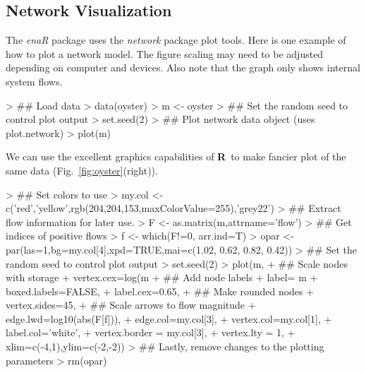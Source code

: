 \documentclass[article]{jss}
\newcommand{\R}{\textbf{R}}
\begin{document}

\subsection{Network Visualization}

The \textit{enaR} package uses the \textit{network} package plot
 tools. Here is
one example of how to plot a network model. The figure scaling may
need to be adjusted depending on computer and devices. Also note that
the graph only shows internal system flows.

\begin{Schunk}
\begin{Sinput}
> ## Load data
> data(oyster)
> m <- oyster
> ## Set the random seed to control plot output
> set.seed(2)
> ## Plot network data object (uses plot.network)
> plot(m)
\end{Sinput}
\end{Schunk}

We can use the excellent graphics capabilities of \R\ to make fancier
plot of the same data (Fig.~\ref{fig:oyster}(right)).


\begin{Schunk}
\begin{Sinput}
> ## Set colors to use
> my.col <- c('red','yellow',rgb(204,204,153,maxColorValue=255),'grey22')
> ## Extract flow information for later use.
> F <- as.matrix(m,attrname='flow')
> ## Get indices of positive flows
> f <- which(F!=0, arr.ind=T)
> opar <- par(las=1,bg=my.col[4],xpd=TRUE,mai=c(1.02, 0.62, 0.82, 0.42))
> ## Set the random seed to control plot output
> set.seed(2)
> plot(m,
+  ## Scale nodes with storage
+       vertex.cex=log(m%
+  ## Add node labels
+       label= m%
+       boxed.labels=FALSE,
+       label.cex=0.65,
+  ## Make rounded nodes
+       vertex.sides=45,
+  ## Scale arrows to flow magnitude
+       edge.lwd=log10(abs(F[f])),
+       edge.col=my.col[3],
+       vertex.col=my.col[1],
+       label.col='white',
+       vertex.border = my.col[3],
+       vertex.lty = 1,
+       xlim=c(-4,1),ylim=c(-2,-2))
> ## Lastly, remove changes to the plotting parameters
> rm(opar)
\end{Sinput}
\end{Schunk}
\end{document}
